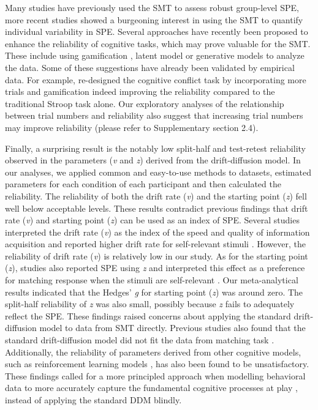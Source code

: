 \documentclass[sn-apa]{sn-jnl}%
\theoremstyle{thmstyleone}%
\theoremstyle{thmstyletwo}%
\theoremstyle{thmstylethree}%
\begin{document}
Many studies have previously used the SMT to assess robust group-level SPE, more recent studies showed a burgeoning interest in using the SMT to quantify individual variability in SPE. Several approaches have recently been proposed to enhance the reliability of cognitive tasks, which may prove valuable for the SMT. These include using gamification \parencite{friehs2020effective}, latent model \parencite{enkavi2019large, eisenberg2019uncovering} or generative models \parencite{haines2020theoretically} to analyze the data. Some of these suggestions have already been validated by empirical data. For example, \textcite{kucina2023calibration} re-designed the cognitive conflict task by incorporating more trials and gamification indeed improving the reliability compared to the traditional Stroop task alone. Our exploratory analyses of the relationship between trial numbers and reliability also suggest that increasing trial numbers may improve reliability (please refer to Supplementary section 2.4). 

Finally, a surprising result is the notably low split-half and test-retest reliability observed in the parameters (\textit{v} and \textit{z}) derived from the drift-diffusion model. In our analyses, we applied common and easy-to-use methods to datasets, estimated parameters for each condition of each participant and then calculated the reliability. The reliability of both the drift rate (\textit{v}) and the starting point (\textit{z}) fell well below acceptable levels. These results contradict previous findings that drift rate (\textit{v}) and starting point (\textit{z}) can be used as an index of SPE. Several studies interpreted the drift rate (\textit{v}) as the index of the speed and quality of information acquisition and reported higher drift rate for self-relevant stimuli \parencite[e.g.,][]{golubickis2017self,golubickis2020parts}. However, the reliability of drift rate (\textit{v}) is relatively low in our study. As for the starting point (\textit{z}), studies also reported SPE using \textit{z} and interpreted this effect as a preference for matching response when the stimuli are self-relevant \parencite[e.g.,][]{macrae2017self,reuther2017does}. Our meta-analytical results indicated that the Hedges' \textit{g }for starting point (\textit{z}) was around zero. The split-half reliability of \textit{z} was also small, possibly because \textit{z} fails to adequately reflect the SPE. These findings raised concerns about applying the standard drift-diffusion model to data from SMT directly. Previous studies also found that the standard drift-diffusion model did not fit the data from matching task \parencite{groulx2020ez}. Additionally, the reliability of parameters derived from other cognitive models, such as reinforcement learning models \parencite{eckstein2022interpretation}, has also been found to be unsatisfactory. These findings called for a more principled approach when modelling behavioral data to more accurately capture the fundamental cognitive processes at play \parencite[e.g.,][]{wilson2019ten}, instead of applying the standard DDM blindly.  
\end{document}

